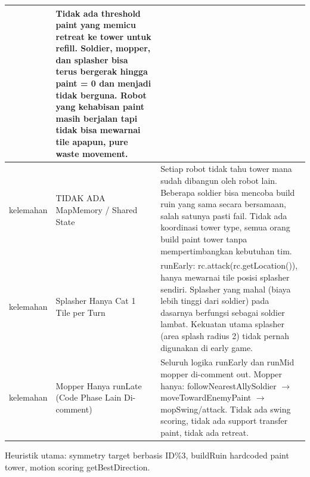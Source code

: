 \documentclass{article}
\begin{document}
\begin{enumerate}[label=\alph*.]
\begin{longtable}{|p{2cm}|p{3.5cm}|p{8.5cm}|}
& Tidak ada threshold paint yang memicu retreat ke tower untuk refill.
Soldier, mopper, dan splasher bisa terus bergerak hingga paint = 0 dan menjadi tidak berguna.
Robot yang kehabisan paint masih berjalan tapi tidak bisa mewarnai tile apapun, pure waste movement. \\
\hline
kelemahan
& TIDAK ADA MapMemory / Shared State
& Setiap robot tidak tahu tower mana sudah dibangun oleh robot lain.
Beberapa soldier bisa mencoba build ruin yang sama secara bersamaan, salah satunya pasti fail.
Tidak ada koordinasi tower type, semua orang build paint tower tanpa mempertimbangkan kebutuhan tim. \\
\hline
kelemahan
& Splasher Hanya Cat 1 Tile per Turn
& runEarly: rc.attack(rc.getLocation()), hanya mewarnai tile posisi splasher sendiri.
Splasher yang mahal (biaya lebih tinggi dari soldier) pada dasarnya berfungsi sebagai soldier lambat.
Kekuatan utama splasher (area splash radius 2) tidak pernah digunakan di early game. \\
\hline
kelemahan
& Mopper Hanya runLate (Code Phase Lain Di-comment)
& Seluruh logika runEarly dan runMid mopper di-comment out.
Mopper hanya: followNearestAllySoldier $\rightarrow$ moveTowardEnemyPaint $\rightarrow$ mopSwing/attack.
Tidak ada swing scoring, tidak ada support transfer paint, tidak ada retreat. \\
\hline
\end{longtable}


Heuristik utama: symmetry target berbasis ID\%3, buildRuin hardcoded paint tower, motion scoring getBestDirection.


\end{enumerate}
\end{document}
